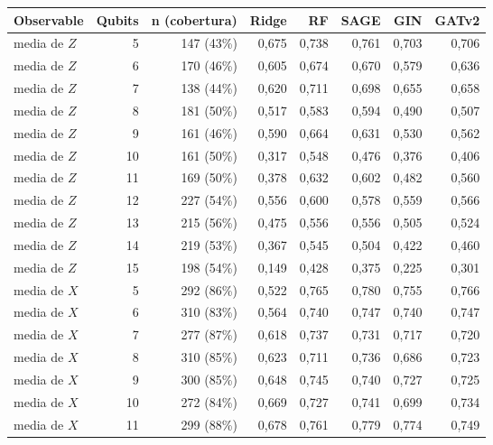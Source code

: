\begin{table}[htbp]
    \centering
    {\footnotesize
    \begin{tabular}{@{}lrrrrrrr@{}}
        \toprule
        \textbf{Observable} & \textbf{Qubits} & \textbf{n (cobertura)} & \textbf{Ridge} & \textbf{RF} & \textbf{SAGE} & \textbf{GIN} & \textbf{GATv2} \\
        \midrule
        media de $Z$ & 5 & 147 (43\%) & 0,675 & 0,738 & 0,761 & 0,703 & 0,706 \\
        media de $Z$ & 6 & 170 (46\%) & 0,605 & 0,674 & 0,670 & 0,579 & 0,636 \\
        media de $Z$ & 7 & 138 (44\%) & 0,620 & 0,711 & 0,698 & 0,655 & 0,658 \\
        media de $Z$ & 8 & 181 (50\%) & 0,517 & 0,583 & 0,594 & 0,490 & 0,507 \\
        media de $Z$ & 9 & 161 (46\%) & 0,590 & 0,664 & 0,631 & 0,530 & 0,562 \\
        media de $Z$ & 10 & 161 (50\%) & 0,317 & 0,548 & 0,476 & 0,376 & 0,406 \\
        media de $Z$ & 11 & 169 (50\%) & 0,378 & 0,632 & 0,602 & 0,482 & 0,560 \\
        media de $Z$ & 12 & 227 (54\%) & 0,556 & 0,600 & 0,578 & 0,559 & 0,566 \\
        media de $Z$ & 13 & 215 (56\%) & 0,475 & 0,556 & 0,556 & 0,505 & 0,524 \\
        media de $Z$ & 14 & 219 (53\%) & 0,367 & 0,545 & 0,504 & 0,422 & 0,460 \\
        media de $Z$ & 15 & 198 (54\%) & 0,149 & 0,428 & 0,375 & 0,225 & 0,301 \\
        media de $X$ & 5 & 292 (86\%) & 0,522 & 0,765 & 0,780 & 0,755 & 0,766 \\
        media de $X$ & 6 & 310 (83\%) & 0,564 & 0,740 & 0,747 & 0,740 & 0,747 \\
        media de $X$ & 7 & 277 (87\%) & 0,618 & 0,737 & 0,731 & 0,717 & 0,720 \\
        media de $X$ & 8 & 310 (85\%) & 0,623 & 0,711 & 0,736 & 0,686 & 0,723 \\
        media de $X$ & 9 & 300 (85\%) & 0,648 & 0,745 & 0,740 & 0,727 & 0,725 \\
        media de $X$ & 10 & 272 (84\%) & 0,669 & 0,727 & 0,741 & 0,699 & 0,734 \\
        media de $X$ & 11 & 299 (88\%) & 0,678 & 0,761 & 0,779 & 0,774 & 0,749 \\

\end{tabular}}
\end{table}
